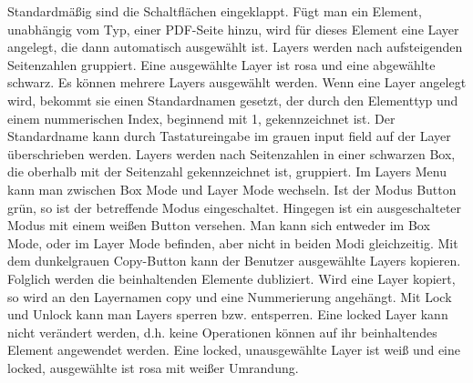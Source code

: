 Standardmäßig sind die Schaltflächen eingeklappt. Fügt man ein Element, unabhängig vom Typ, einer PDF-Seite hinzu, wird für dieses Element eine Layer angelegt, die dann automatisch ausgewählt ist. Layers werden nach aufsteigenden Seitenzahlen gruppiert. Eine ausgewählte Layer ist rosa und eine abgewählte schwarz. Es können mehrere Layers ausgewählt werden. Wenn eine Layer angelegt wird, bekommt sie einen Standardnamen gesetzt, der durch den Elementtyp und einem nummerischen Index, beginnend mit 1, gekennzeichnet ist. Der Standardname kann durch Tastatureingabe im grauen input field auf der Layer überschrieben werden. Layers werden nach Seitenzahlen in einer schwarzen Box, die oberhalb mit der Seitenzahl gekennzeichnet ist, gruppiert. Im Layers Menu kann man zwischen Box Mode und Layer Mode wechseln. Ist der Modus Button grün, so ist der betreffende Modus eingeschaltet. Hingegen ist ein ausgeschalteter Modus mit einem weißen Button versehen. Man kann sich entweder im Box Mode, oder im Layer Mode befinden, aber nicht in beiden Modi gleichzeitig. Mit dem dunkelgrauen Copy-Button kann der Benutzer ausgewählte Layers kopieren. Folglich werden die beinhaltenden Elemente dubliziert. Wird eine Layer kopiert, so wird an den Layernamen copy und eine Nummerierung angehängt. Mit Lock und Unlock kann man Layers sperren bzw. entsperren. Eine locked Layer kann nicht verändert werden, d.h. keine Operationen können auf ihr beinhaltendes Element angewendet werden. Eine locked, unausgewählte Layer ist weiß und eine locked, ausgewählte ist rosa mit weißer Umrandung. 

